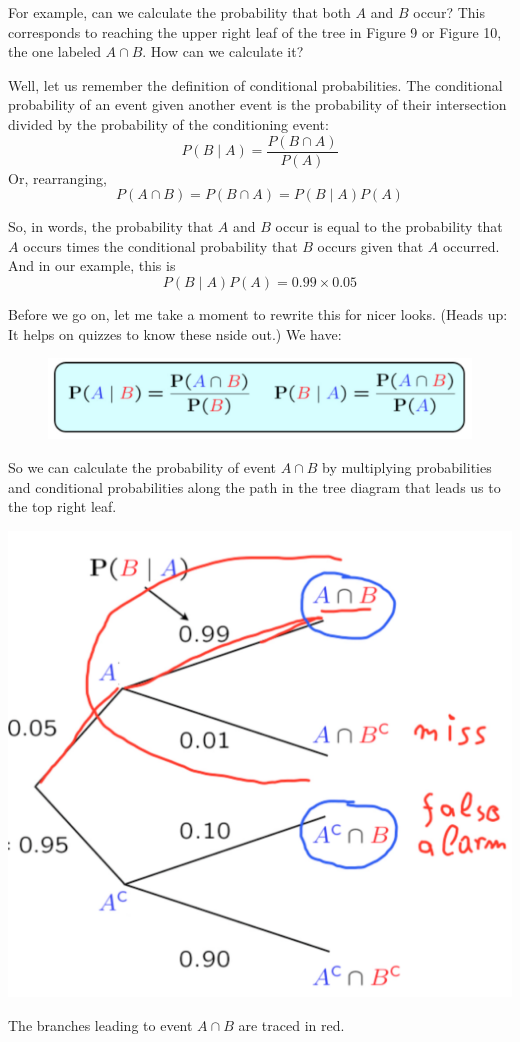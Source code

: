 \documentclass{tufte-handout}
\begin{document}
For example, can we calculate the
probability that both $A$ and $B$ occur? This corresponds to reaching the upper right leaf of the tree in
Figure 9 or Figure 10, the one labeled $A \cap B$. How can we calculate it?

Well, let us remember the definition of conditional probabilities. The conditional probability of an event
given another event is the probability of their intersection divided by the probability of the conditioning
event: 
$$
P(B \mid A) = \frac{P(B \cap A)}{P(A)}
$$
Or, rearranging, 
$$
P(A \cap B) = P(B \cap A) = P(B \mid A) P(A)
$$

So, in words, the probability that $A$ and $B$ occur is equal to the probability that $A$ occurs times the
conditional probability that $B$ occurs given that $A$ occurred.  And in our example, this is 
$$
P(B \mid A) P(A) = 0.99 \times 0.05 
$$

Before we go on, let me take a moment to rewrite this for nicer looks. (Heads up: It helps on quizzes to know these 
nside out.) We have:

\begin{figure}
  \includegraphics{DefCondProbs}
\end{figure}


So we can calculate the probability of event $A \cap B$ by multiplying probabilities and conditional
probabilities along the path in the tree diagram that leads us to the top right leaf. 

\begin{marginfigure}
  \includegraphics{TreeBranchesRed}
  \caption{The branches leading to event $A \cap B$ are traced in red.}
\end{marginfigure}
\end{document}
